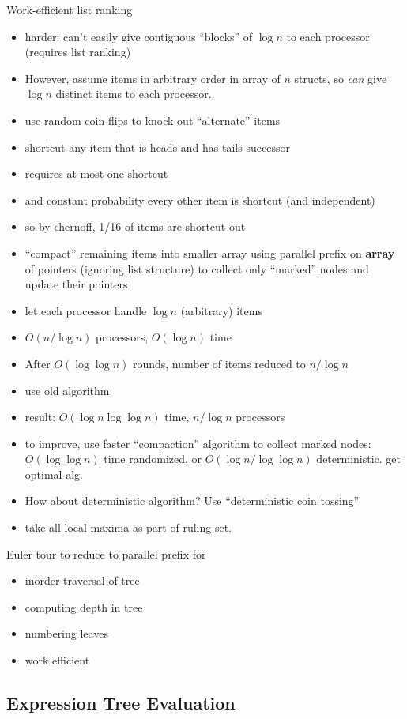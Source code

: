 \documentclass[12pt]{article}
\begin{document}
Work-efficient list ranking
\begin{itemize}
\item harder: can't easily give contiguous ``blocks'' of $\log n$ to each
  processor (requires list ranking)
\item However, assume items in arbitrary order in array of $ n$
  structs, so \emph{can} give $\log n$ distinct items to each processor.
\item use random coin flips to knock out ``alternate'' items
\item shortcut any item that is heads and has tails successor
\item requires at most one shortcut
\item and constant probability every other item is shortcut (and
  independent)
\item so by chernoff, 1/16 of items are shortcut out
\item ``compact'' remaining items into smaller array using parallel
  prefix on \textbf{array} of pointers (ignoring list structure) to
  collect only ``marked'' nodes and update their pointers 
\item let each processor handle $\log n$ (arbitrary) items
\item $O(n/\log n)$ processors, $O(\log n)$ time
\item After $O(\log\log n)$ rounds, number of items reduced to $n/\log
  n$
\item use old algorithm
\item result: $O(\log n \log\log n)$ time, $n/\log n$ processors
\item to improve, use faster ``compaction'' algorithm to collect
  marked nodes: $O(\log\log n)$ time randomized, or $O(\log n/\log\log
  n)$ deterministic.  get optimal alg.
\item How about deterministic algorithm?  Use ``deterministic coin
  tossing''
\item take all local maxima as part of ruling set.
\end{itemize}

Euler tour to reduce to parallel prefix for
\begin{itemize}
\item inorder traversal of tree
\item computing depth in tree
\item numbering leaves
\item work efficient
\end{itemize}

\subsection*{Expression Tree Evaluation}
\end{document}
